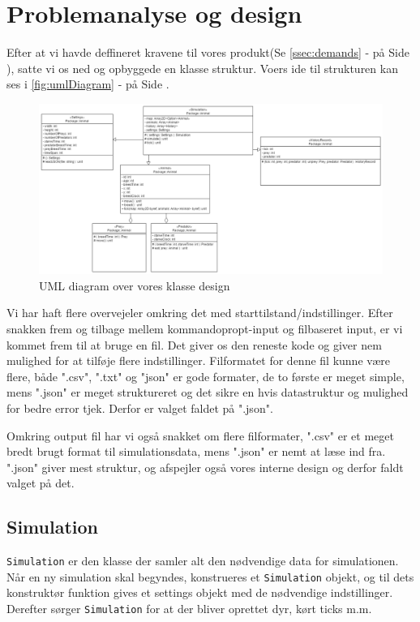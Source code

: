 \documentclass[a4paper]{article}
\newcommand{\namedref}[1]{\autoref{#1} - \nameref{#1} på Side \pageref{#1}}
\begin{document}
  \section{Problemanalyse og design} \label{sec:design}
    Efter at vi havde deffineret kravene til vores produkt(Se \namedref{ssec:demands}),
    satte vi os ned og opbyggede en klasse struktur.
    Voers ide til strukturen kan ses i \namedref{fig:umlDiagram}.

    \begin{figure}[H]
      \centering

      \includegraphics[width=520px]{figures/uml.png}

      \caption{UML diagram over vores klasse design}
      \label{fig:umlDiagram}
    \end{figure}

    Vi har haft flere overvejeler omkring det med starttilstand/indstillinger.
    Efter snakken frem og tilbage mellem kommandopropt-input og filbaseret input,
    er vi kommet frem til at bruge en fil.
    Det giver os den reneste kode og giver nem mulighed for at tilføje flere indstillinger.
    Filformatet for denne fil kunne være flere, både ".csv", ".txt" og "json" er gode formater,
    de to første er meget simple, mens ".json" er meget struktureret og det sikre en hvis datastruktur
    og mulighed for bedre error tjek. Derfor er valget faldet på ".json".

    Omkring output fil har vi også snakket om flere filformater,
    ".csv" er et meget bredt brugt format til simulationsdata,
    mens ".json" er nemt at læse ind fra. ".json" giver mest struktur,
    og afspejler også vores interne design og derfor faldt valget på det.

    \subsection*{Simulation}
      \texttt{Simulation} er den klasse der samler alt den nødvendige data for simulationen.
      Når en ny simulation skal begyndes, konstrueres et \texttt{Simulation} objekt,
      og til dets konstruktør funktion gives et settings objekt med de nødvendige indstillinger.
      Derefter sørger \texttt{Simulation} for at der bliver oprettet dyr,
      kørt ticks m.m.
\end{document}
